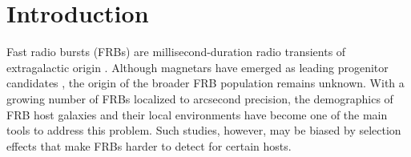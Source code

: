 \documentclass[apjl, linenumbers]{aastex701}
\begin{document}


\section{Introduction}  \label{sec:intro}

Fast radio bursts (FRBs) are millisecond-duration radio transients of extragalactic origin \citep{LorimerFirstFRB}. Although magnetars have emerged as leading progenitor candidates \citep{CHIME2020, MagnetarFRB2}, the origin of the broader FRB population remains unknown. With a growing number of FRBs localized to arcsecond precision, the demographics of FRB host galaxies and their local environments \citep{Gordon2023} have become one of the main tools to address this problem. Such studies, however, may be biased by selection effects that make FRBs harder to detect for certain hosts.
\end{document}
